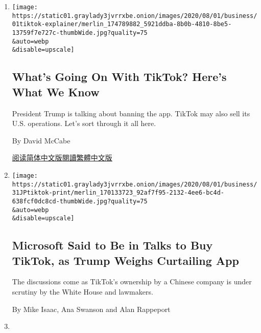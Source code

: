 \begin{enumerate}
\def\labelenumi{\arabic{enumi}.}
\item
  \href{/2020/08/01/technology/tiktok-trump-microsoft-bytedance-china-ban.html}{}

  \texttt{[image: https://static01.graylady3jvrrxbe.onion/images/2020/08/01/business/01tiktok-explainer/merlin\_174789882\_5921ddba-8b0b-4810-8be5-13759f7e727c-thumbWide.jpg?quality=75\\\&auto=webp\\\&disable=upscale]}

  \hypertarget{whats-going-on-with-tiktok-heres-what-we-know}{%
  \subsection{What's Going On With TikTok? Here's What We
  Know}\label{whats-going-on-with-tiktok-heres-what-we-know}}

  President Trump is talking about banning the app. TikTok may also sell
  its U.S. operations. Let's sort through it all here.

  By David McCabe

  \href{https://cn.nytimes3xbfgragh.onion/technology/20200803/tiktok-trump-microsoft-bytedance-china-ban/}{阅读简体中文版}\href{https://cn.nytimes3xbfgragh.onion/technology/20200803/tiktok-trump-microsoft-bytedance-china-ban/zh-hant/}{閱讀繁體中文版}
\item
  \href{/2020/07/31/technology/tiktok-microsoft.html}{}

  \texttt{[image: https://static01.graylady3jvrrxbe.onion/images/2020/08/01/business/31JPtiktok-print/merlin\_170133723\_92af7f95-2132-4ee6-bc4d-638fcf0dc8cd-thumbWide.jpg?quality=75\\\&auto=webp\\\&disable=upscale]}

  \hypertarget{microsoft-said-to-be-in-talks-to-buy-tiktok-as-trump-weighs-curtailing-app}{%
  \subsection{Microsoft Said to Be in Talks to Buy TikTok, as Trump
  Weighs Curtailing
  App}\label{microsoft-said-to-be-in-talks-to-buy-tiktok-as-trump-weighs-curtailing-app}}

  The discussions come as TikTok's ownership by a Chinese company is
  under scrutiny by the White House and lawmakers.

  By Mike Isaac, Ana Swanson and Alan Rappeport
\item
  \href{/2020/07/29/technology/big-tech-hearing-apple-amazon-facebook-google.html}{}


\end{enumerate}
